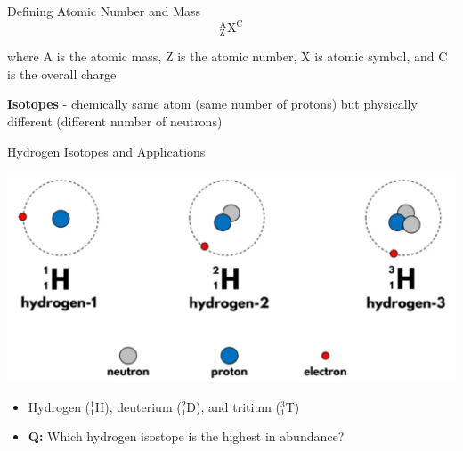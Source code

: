 \documentclass[11pt]{beamer}
\begin{document}
\begin{frame}{Defining Atomic Number and Mass}
  \begin{equation}
    ^\text{A}_\text{Z}\text{X}^\text{C}
  \end{equation}

  where A is the atomic mass, Z is the atomic number, X is atomic
  symbol, and C is the overall charge

  \textbf{Isotopes} - chemically same atom (same number of protons)
  but physically different (different number of neutrons)
\end{frame}

\begin{frame}{Hydrogen Isotopes and Applications}
  \begin{center}
    \includegraphics[width=0.75\linewidth]{hydro_iso}
  \end{center}

  \begin{itemize}
  \item Hydrogen ($^1_1$H), deuterium ($^2_1$D), and tritium ($^3_1$T)
  \item \textbf{Q:} Which hydrogen isostope is the highest in abundance?
  \end{itemize}
\end{frame}
\end{document}
